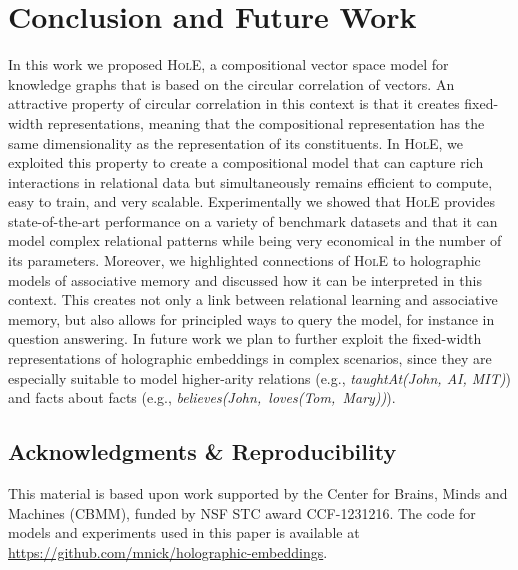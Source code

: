 \documentclass[letterpaper]{article}
\newcommand{\hole}{\textsc{HolE}\xspace}
\begin{document}
\section{Conclusion and Future Work}
In this work we proposed \hole, a compositional vector space model
for knowledge graphs that is based on the circular correlation of vectors.
An attractive property of circular correlation in this context is that it
creates fixed-width representations, meaning that the compositional
representation has the same dimensionality as the representation of its
constituents. 
In \hole, we exploited this property to create a compositional
model that can capture rich interactions in relational data but simultaneously
remains efficient to compute, easy to train, and very scalable. 
Experimentally we showed that \hole provides state-of-the-art performance on a
variety of benchmark datasets and that it can model complex relational patterns
while being very economical in the number of its parameters.
Moreover, we highlighted connections of \hole to holographic models of
associative memory and discussed how it can be interpreted in this context. This
creates not only a link between relational learning and associative memory, but
also allows for principled ways to query the model, for instance in question
answering.
In future work we plan to further exploit the fixed-width representations of
holographic embeddings in complex scenarios, since they are
especially suitable to model higher-arity relations (e.g., \textit{taughtAt(John, AI,
  MIT)}) and facts about facts (e.g., \mbox{\textit{believes(John, loves(Tom,
    Mary))}}).


\subsection*{Acknowledgments \& Reproducibility}
This material is based upon work supported by the Center for Brains, Minds and
Machines (CBMM), funded by NSF STC award CCF-1231216. 
The code for models and experiments used in this paper is available at
\url{https://github.com/mnick/holographic-embeddings}.

{
  
  
}
\end{document}

